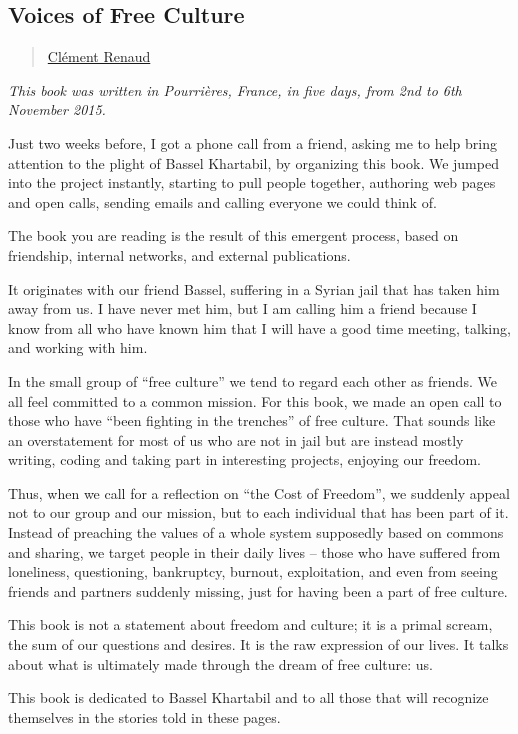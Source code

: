 \subsection{Voices of Free Culture}\label{voices-of-free-culture}

\begin{quote}
\href{appendix/attributions.html\#clement-renaud}{Clément Renaud}
\end{quote}

\emph{This book was written in Pourrières, France, in five days, from
2nd to 6th November 2015.}

Just two weeks before, I got a phone call from a friend, asking me to
help bring attention to the plight of Bassel Khartabil, by organizing
this book. We jumped into the project instantly, starting to pull people
together, authoring web pages and open calls, sending emails and calling
everyone we could think of.

The book you are reading is the result of this emergent process, based
on friendship, internal networks, and external publications.

It originates with our friend Bassel, suffering in a Syrian jail that
has taken him away from us. I have never met him, but I am calling him a
friend because I know from all who have known him that I will have a
good time meeting, talking, and working with him.

In the small group of ``free culture'' we tend to regard each other as
friends. We all feel committed to a common mission. For this book, we
made an open call to those who have ``been fighting in the trenches'' of
free culture. That sounds like an overstatement for most of us who are
not in jail but are instead mostly writing, coding and taking part in
interesting projects, enjoying our freedom.

Thus, when we call for a reflection on ``the Cost of Freedom'', we
suddenly appeal not to our group and our mission, but to each individual
that has been part of it. Instead of preaching the values of a whole
system supposedly based on commons and sharing, we target people in
their daily lives -- those who have suffered from loneliness,
questioning, bankruptcy, burnout, exploitation, and even from seeing
friends and partners suddenly missing, just for having been a part of
free culture.

This book is not a statement about freedom and culture; it is a primal
scream, the sum of our questions and desires. It is the raw expression
of our lives. It talks about what is ultimately made through the dream
of free culture: us.

This book is dedicated to Bassel Khartabil and to all those that will
recognize themselves in the stories told in these pages.
